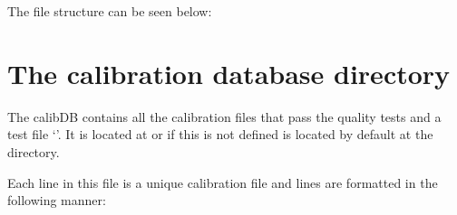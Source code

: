 \noindent The file structure can be seen below:
\begin{tcustomdir}
\end{tcustomdir}

\clearpage
\newpage
\section{The calibration database directory}
\label{ch:data_architecture:calibDB}
\begin{tcustomdir}
\end{tcustomdir}
\noindent The calibDB contains all the calibration files that pass the quality tests and a test file `\masterCALIBDBfile'. It is located at  or if this is not defined is located by default at the  directory.

\noindent Each line in this file is a unique calibration file and lines are formatted in the following manner:

